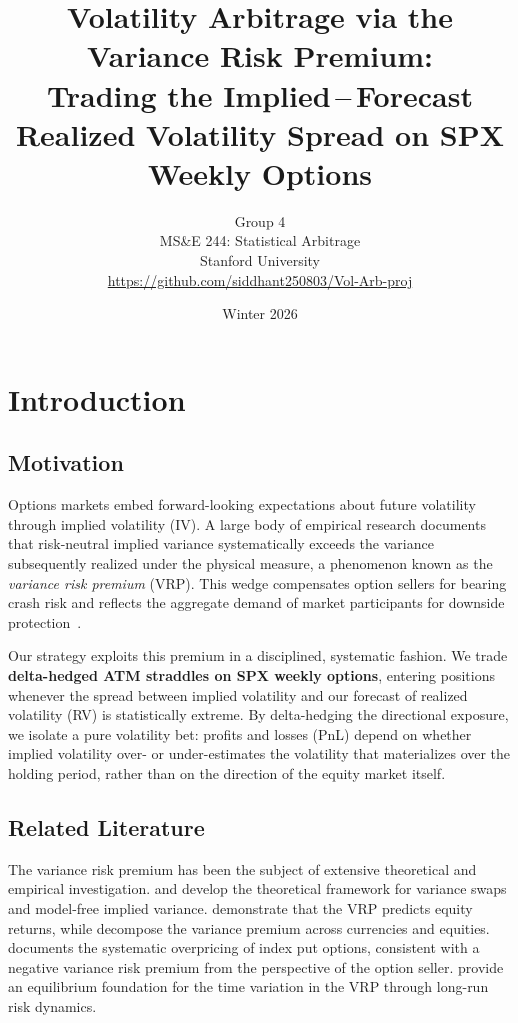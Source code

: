 \documentclass[11pt,a4paper]{article}
\title{
    \vspace{-1cm}
    \textbf{Volatility Arbitrage via the Variance Risk Premium:} \\[4pt]
    \large Trading the Implied\,--\,Forecast Realized Volatility Spread on SPX Weekly Options
}
\author{
    Group 4 \\
    MS\&E 244: Statistical Arbitrage \\
    Stanford University \\
     \href{https://github.com/siddhant250803/Vol-Arb-proj}{https://github.com/siddhant250803/Vol-Arb-proj}
}
\date{Winter 2026}
\begin{document}
\maketitle
\thispagestyle{fancy}

\section{Introduction}

\subsection{Motivation}

Options markets embed forward-looking expectations about future volatility through implied volatility (IV).
A large body of empirical research documents that risk-neutral implied variance systematically exceeds the variance subsequently realized under the physical measure, a phenomenon known as the \emph{variance risk premium} (VRP).
This wedge compensates option sellers for bearing crash risk and reflects the aggregate demand of market participants for downside protection~\citep{bollerslev2009expected, carr2009variance}.

Our strategy exploits this premium in a disciplined, systematic fashion.
We trade \textbf{delta-hedged ATM straddles on SPX weekly options}, entering positions whenever the spread between implied volatility and our forecast of realized volatility (RV) is statistically extreme.
By delta-hedging the directional exposure, we isolate a pure volatility bet: profits and losses (PnL) depend on whether implied volatility over- or under-estimates the volatility that materializes over the holding period, rather than on the direction of the equity market itself.

\subsection{Related Literature}

The variance risk premium has been the subject of extensive theoretical and empirical investigation.
\citet{carr1998towards} and \citet{demeterfi1999more} develop the theoretical framework for variance swaps and model-free implied variance.
\citet{bollerslev2009expected} demonstrate that the VRP predicts equity returns, while \citet{carr2009variance} decompose the variance premium across currencies and equities.
\citet{bondarenko2003why} documents the systematic overpricing of index put options, consistent with a negative variance risk premium from the perspective of the option seller.
\citet{drechsler2011whats} provide an equilibrium foundation for the time variation in the VRP through long-run risk dynamics.
\end{document}
